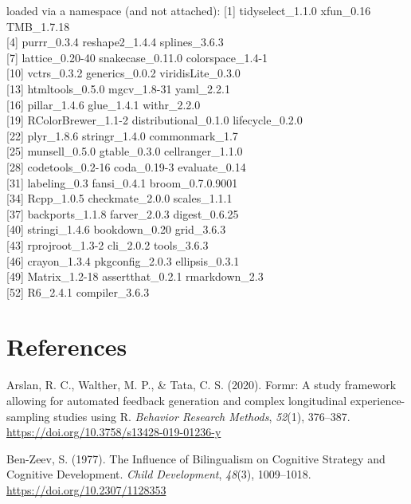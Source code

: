 \documentclass[
  english,
  man,man,floatsintext]{apa6}
\begin{document}
loaded via a namespace (and not attached):
{[}1{]} tidyselect\_1.1.0 xfun\_0.16 TMB\_1.7.18\\
{[}4{]} purrr\_0.3.4 reshape2\_1.4.4 splines\_3.6.3\\
{[}7{]} lattice\_0.20-40 snakecase\_0.11.0 colorspace\_1.4-1\\
{[}10{]} vctrs\_0.3.2 generics\_0.0.2 viridisLite\_0.3.0\\
{[}13{]} htmltools\_0.5.0 mgcv\_1.8-31 yaml\_2.2.1\\
{[}16{]} pillar\_1.4.6 glue\_1.4.1 withr\_2.2.0\\
{[}19{]} RColorBrewer\_1.1-2 distributional\_0.1.0 lifecycle\_0.2.0\\
{[}22{]} plyr\_1.8.6 stringr\_1.4.0 commonmark\_1.7\\
{[}25{]} munsell\_0.5.0 gtable\_0.3.0 cellranger\_1.1.0\\
{[}28{]} codetools\_0.2-16 coda\_0.19-3 evaluate\_0.14\\
{[}31{]} labeling\_0.3 fansi\_0.4.1 broom\_0.7.0.9001\\
{[}34{]} Rcpp\_1.0.5 checkmate\_2.0.0 scales\_1.1.1\\
{[}37{]} backports\_1.1.8 farver\_2.0.3 digest\_0.6.25\\
{[}40{]} stringi\_1.4.6 bookdown\_0.20 grid\_3.6.3\\
{[}43{]} rprojroot\_1.3-2 cli\_2.0.2 tools\_3.6.3\\
{[}46{]} crayon\_1.3.4 pkgconfig\_2.0.3 ellipsis\_0.3.1\\
{[}49{]} Matrix\_1.2-18 assertthat\_0.2.1 rmarkdown\_2.3\\
{[}52{]} R6\_2.4.1 compiler\_3.6.3

\hypertarget{references}{%
\section{References}\label{references}}

\begingroup
\setlength{\parindent}{-0.5in}
\setlength{\leftskip}{0.5in}

\hypertarget{refs}{}
\leavevmode\hypertarget{ref-arslan2020}{}%
Arslan, R. C., Walther, M. P., \& Tata, C. S. (2020). Formr: A study framework allowing for automated feedback generation and complex longitudinal experience-sampling studies using R. \emph{Behavior Research Methods}, \emph{52}(1), 376--387. \url{https://doi.org/10.3758/s13428-019-01236-y}

\leavevmode\hypertarget{ref-ben-zeev1977}{}%
Ben-Zeev, S. (1977). The Influence of Bilingualism on Cognitive Strategy and Cognitive Development. \emph{Child Development}, \emph{48}(3), 1009--1018. \url{https://doi.org/10.2307/1128353}
\end{document}
